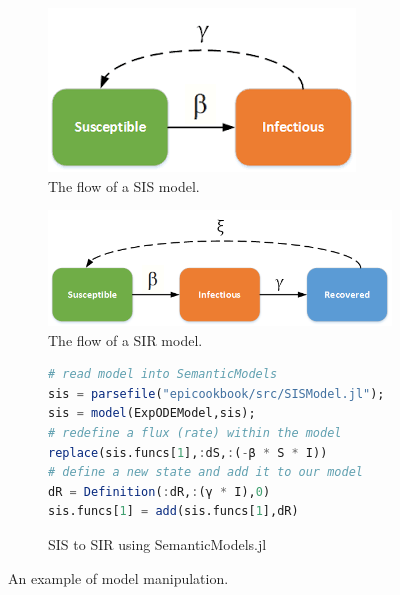 \documentclass{juliacon}
\begin{document}
\begin{figure}[b]
  \begin{subfigure}[b]{0.16\textwidth}
    \includegraphics[width=\textwidth]{img/SIS.png}
    \caption{The flow of a SIS model.}\label{fig:SIS}
  \end{subfigure}
  \hspace{1em}
  \begin{subfigure}[b]{0.26\textwidth}
    \includegraphics[width=\textwidth]{img/SIR-SIRS.png}
  \vspace{0em}
    \caption{The flow of a SIR model.}\label{fig:SIR}
  \end{subfigure}

\vspace{-1em}
\begin{subfigure}[b]{0.45\textwidth}
\begin{lstlisting}[language=Julia]
# read model into SemanticModels
sis = parsefile("epicookbook/src/SISModel.jl");
sis = model(ExpODEModel,sis);
# redefine a flux (rate) within the model
replace(sis.funcs[1],:dS,:(-β * S * I))
# define a new state and add it to our model
dR = Definition(:dR,:(γ * I),0)
sis.funcs[1] = add(sis.funcs[1],dR)
\end{lstlisting}
\caption{SIS to SIR using SemanticModels.jl}\label{fig:graft}
\end{subfigure}

\caption{An example of model manipulation.}
\end{figure}

\end{document}
